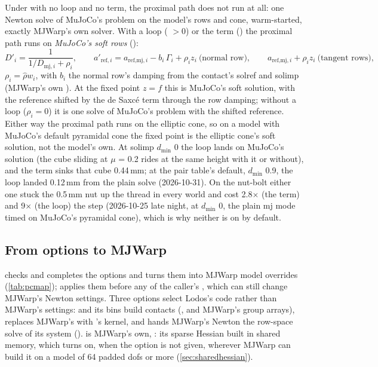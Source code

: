 Under  with no loop and no term, the proximal path does not run at all: one Newton solve of MuJoCo's problem on the model's rows and cone, warm-started, exactly MJWarp's own solver. With a loop ( $> 0$) or the term () the proximal path runs on \emph{MuJoCo's soft rows} ():
\begin{equation}\label{eq:softrows}
D'_i = \frac{1}{1/D_{\text{mj},i} + \rho_i}, \qquad
a'_{\text{ref},i} = a_{\text{ref,mj},i} - b_i\,\Gamma_i + \rho_i z_i \ \text{(normal row)}, \qquad
a_{\text{ref,mj},i} + \rho_i z_i \ \text{(tangent rows)},
\end{equation}
$\rho_i = \hat\rho w_i$, with $b_i$ the normal row's damping from the contact's solref and solimp (MJWarp's own ). At the fixed point $z = f$ this is MuJoCo's soft solution, with the reference shifted by the de Saxc\'e term through the row damping; without a loop ($\rho_i = 0$) it is one solve of MuJoCo's problem with the shifted reference. Either way the proximal path runs on the elliptic cone, so on a model with MuJoCo's default pyramidal cone the fixed point is the elliptic cone's soft solution, not the model's own. At solimp $d_{\min}$ 0 the loop lands on MuJoCo's solution (the cube sliding at $\mu$ = 0.2 rides at the same height with it or without), and the term sinks that cube 0.44\,mm; at the pair table's default, $d_{\min}$ 0.9, the loop landed 0.12\,mm from the plain solve (2026-10-31). On the nut-bolt either one stuck the 0.5\,mm nut up the thread in every world and cost 2.8$\times$ (the term) and 9$\times$ (the loop) the step (2026-10-25 late night, at $d_{\min}$ 0, the plain mj mode timed on MuJoCo's pyramidal cone), which is why neither is on by default.

\subsection{From options to MJWarp}\label{sec:pcoptions}

 checks and completes the options and  turns them into MJWarp model overrides (\cref{tab:pcmap});  applies them before any of the caller's , which can still change MJWarp's Newton settings. Three options select Lodos's code rather than MJWarp's settings:  and its bins build  contacts (, and MJWarp's group arrays),  replaces MJWarp's  with 's kernel, and  hands MJWarp's Newton the row-space solve of its system ().  is MJWarp's own, : its sparse Hessian built in shared memory, which  turns on, when the option is not given, wherever MJWarp can build it on a model of 64 padded dofs or more (\cref{sec:sharedhessian}).

